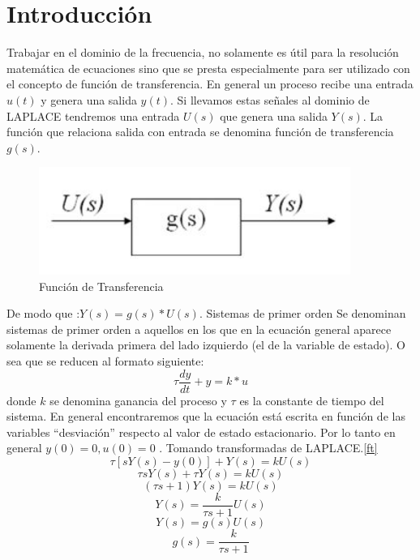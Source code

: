 \documentclass[12pt,a4paper]{report}
\begin{document}
\chapter{Introducción}
Trabajar en el dominio de la frecuencia, no solamente es útil para la resolución matemática de
ecuaciones sino que se presta especialmente para ser utilizado con el concepto de
función de transferencia. En general un proceso recibe una entrada $u(t)$ y genera una
salida $y(t)$. Si llevamos estas señales al dominio de LAPLACE tendremos una entrada
$U(s)$ que genera una salida $Y(s)$. La función que relaciona salida con entrada se
denomina función de transferencia $g(s)$.\\
\begin{figure}[h!]
  \centering
    \includegraphics[width=4.0in]{funciontransferencia}
  \caption{Función de Transferencia}
\end{figure}
De modo que :$Y(s) = g(s)*U(s).$
Sistemas de primer orden
Se denominan sistemas de primer orden a aquellos en los que en la ecuación general
aparece solamente la derivada primera del lado izquierdo (el de la variable de estado). O
sea que se reducen al formato siguiente:
\begin{equation}
\tau\frac{dy}{dt}+y= k*u
\end{equation}
donde $k$ se denomina ganancia del proceso y $\tau$ es la constante de tiempo del sistema.
En general encontraremos que la ecuación está escrita en función de las variables
“desviación” respecto al valor de estado estacionario. Por lo tanto en general $y(0) = 0 ,
u(0) = 0$ . Tomando transformadas de LAPLACE.\ref{ft}
\begin{equation*}
\tau [s Y(s)-y(0)]+Y(s)=kU(s)
\end{equation*}
\begin{equation*}
\tau s Y(s)+ \tau Y(s)=kU(s)
\end{equation*}
\begin{equation*}
( \tau s+1)Y(s)=kU(s)
\end{equation*}
\begin{equation*}
Y(s)=\frac{k}{\tau s+1}U(s)
\end{equation*}
\begin{equation*}
Y(s)=g(s)U(s)
\end{equation*}
\begin{equation*}
g(s)=\frac{k}{\tau s+1}
\end{equation*}
\end{document}
